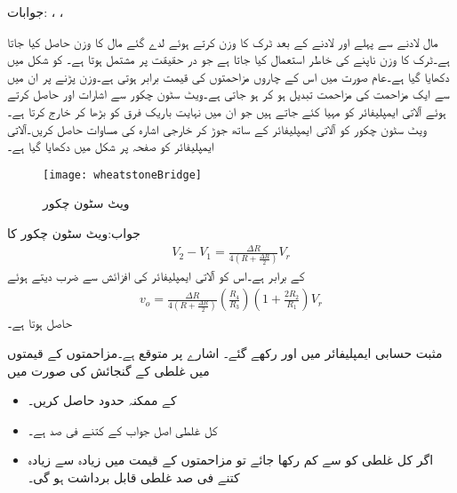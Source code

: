 جوابات: ،  ،  


مال لادنے سے پہلے اور لادنے کے بعد ٹرک کا وزن   کرتے ہوئے لدے گئے مال کا وزن حاصل کیا جاتا ہے۔ٹرک کا وزن ناپنے کی خاطر  استعمال کیا جاتا ہے جو در حقیقت  پر مشتمل ہوتا ہے۔ کو شکل  میں دکھایا گیا ہے۔عام صورت میں اس کے چاروں مزاحمتوں کی قیمت برابر  ہوتی ہے۔وزن پڑنے پر ان میں سے ایک مزاحمت کی مزاحمت تبدیل ہو کر  ہو جاتی ہے۔ویٹ سٹون چکور سے اشارات  اور  حاصل کرتے ہوئے آلاتی ایمپلیفائر کو مہیا کئے جاتے ہیں جو ان میں نہایت باریک فرق  کو بڑھا کر خارج کرتا ہے۔ویٹ سٹون چکور کو آلاتی ایمپلیفائر کے ساتھ جوڑ کر خارجی اشارہ  کی مساوات حاصل کریں۔آلاتی ایمپلیفائر کو  صفحہ  \pageref{شکل_آلاتی_ایمپلیفائر} پر شکل  میں دکھایا گیا ہے۔

\begin{figure}
\centering
\texttt{[image: wheatstoneBridge]}
\caption{ویٹ سٹون چکور}
\label{شکل__سوال_ویٹ_سٹون_چکور}
\end{figure}

جواب:ویٹ سٹون چکور کا
\begin{align*}
V_2-V_1=\frac{\Delta R}{4 \left(R+\frac{\Delta R}{2} \right)}  V_r
\end{align*}
کے برابر ہے۔اس کو آلاتی ایمپلیفائر کی افزائش سے ضرب دیتے ہوئے
%  
\begin{align*}
v_o=\frac{\Delta R}{4 \left(R+\frac{\Delta R}{2} \right)} \left(\frac{R_4}{R_3}\right) \left(1+\frac{2R_2}{R_1} \right) V_r
\end{align*}
حاصل ہوتا ہے۔


مثبت حسابی ایمپلیفائر میں  اور  رکھے گئے۔ اشارے پر  متوقع ہے۔مزاحمتوں کے قیمتوں میں  غلطی  کے گنجائش کی صورت میں
\begin{itemize}
\item
{}  کے ممکنہ حدود حاصل کریں۔
\item
کل غلطی اصل جواب کے کتنے فی صد ہے۔
\item
اگر کل غلطی کو  سے کم رکھا جائے تو مزاحمتوں کے قیمت میں زیادہ سے زیادہ کتنے فی صد غلطی قابل برداشت ہو گی۔
\end{itemize}

